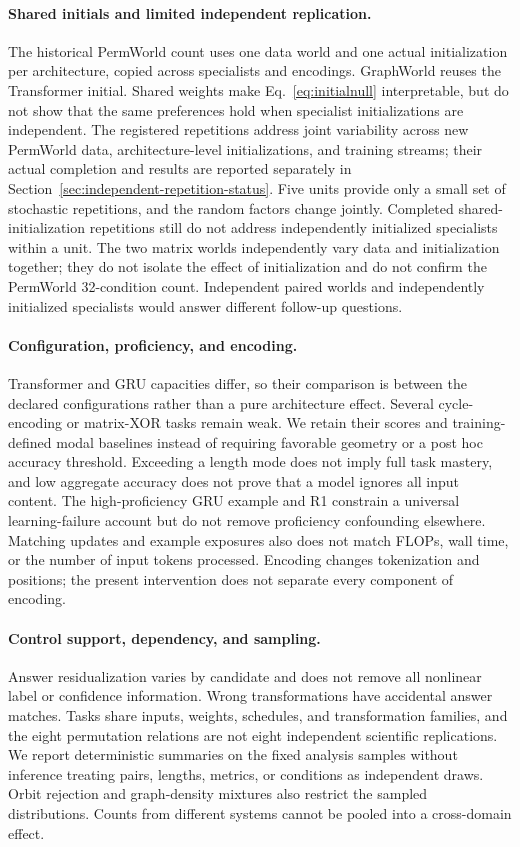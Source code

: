 \documentclass[10pt]{article}
\begin{document}
\paragraph{Shared initials and limited independent replication.}
The historical PermWorld count uses one data world and one actual
initialization per architecture, copied across specialists and encodings.
GraphWorld reuses the Transformer initial. Shared weights make
Eq.~\ref{eq:initialnull} interpretable, but do not show that the same
preferences hold when specialist initializations are independent.
The registered repetitions address joint variability across new PermWorld
data, architecture-level initializations, and training streams; their actual
completion and results are reported separately in
Section~\ref{sec:independent-repetition-status}. Five units provide only a
small set of stochastic repetitions, and the random factors change jointly.
Completed shared-initialization repetitions still do not address
independently initialized specialists within a unit.
The two matrix worlds independently vary data and initialization together;
they do not isolate the effect of initialization and do not confirm the
PermWorld 32-condition count. Independent paired worlds and independently
initialized specialists would answer different follow-up questions.

\paragraph{Configuration, proficiency, and encoding.}
Transformer and GRU capacities differ, so their comparison is between the
declared configurations rather than a pure architecture effect. Several
cycle-encoding or matrix-XOR tasks remain weak. We retain their scores and
training-defined modal baselines instead of requiring favorable geometry
or a post hoc accuracy threshold. Exceeding a length mode does not imply
full task mastery, and low aggregate accuracy does not prove that a model
ignores all input content. The high-proficiency GRU example and R1 constrain
a universal learning-failure account but do not remove proficiency
confounding elsewhere. Matching updates and example exposures also does not
match FLOPs, wall time, or the number of input tokens processed. Encoding
changes tokenization and positions;
the present intervention does not separate every component of encoding.

\paragraph{Control support, dependency, and sampling.}
Answer residualization varies by candidate and does not remove all nonlinear
label or confidence information. Wrong transformations have accidental
answer matches. Tasks share inputs, weights, schedules, and transformation
families, and the eight permutation relations are not eight independent
scientific replications. We report deterministic summaries on the fixed
analysis samples without inference treating pairs, lengths, metrics, or
conditions as independent draws. Orbit rejection and graph-density mixtures
also restrict the sampled distributions. Counts from different systems
cannot be pooled into a cross-domain effect.
\end{document}
